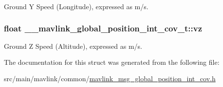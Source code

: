 Ground Y Speed (Longitude), expressed as m/s. 

\hypertarget{struct____mavlink__global__position__int__cov__t_a78f2bb8e9a8890c3f1a64ba05c3870e2}{
\subsubsection[{vz}]{\setlength{\rightskip}{0pt plus 5cm}float \+\_\+\+\_\+mavlink\+\_\+global\+\_\+position\+\_\+int\+\_\+cov\+\_\+t\+::vz}}\label{struct____mavlink__global__position__int__cov__t_a78f2bb8e9a8890c3f1a64ba05c3870e2}


Ground Z Speed (Altitude), expressed as m/s. 



The documentation for this struct was generated from the following file\+:\begin{DoxyCompactItemize}
\item 
src/main/mavlink/common/\hyperlink{mavlink__msg__global__position__int__cov_8h}{mavlink\+\_\+msg\+\_\+global\+\_\+position\+\_\+int\+\_\+cov.\+h}\end{DoxyCompactItemize}

